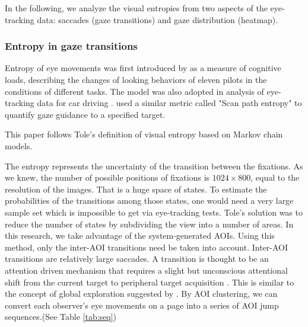 In the following, we analyze the visual entropies from two aspects of the eye-tracking data: saccades (gaze transitions) and gaze distribution (heatmap).

\subsubsection{Entropy in gaze transitions}
Entropy of eye movements was first introduced by  as a measure of cognitive loads, describing the changes of looking behaviors of eleven pilots in the conditions of different tasks. The model was also adopted in analysis of eye-tracking data for car driving \citep{Gilland2008}.  used a similar metric called "Scan path entropy" to quantify gaze guidance to a specified target.

This paper follows Tole's definition of visual entropy based on Markov chain models.

The entropy represents the uncertainty of the transition between the fixations. As we knew, the number of possible positions of fixations is $1024\times800$, equal to the resolution of the images. That is a huge space of states. To estimate the probabilities of the transitions among those states, one would need a very large sample set which is impossible to get via eye-tracking tests. Tole's solution was to reduce the number of states by subdividing the view into a number of areas. In this research, we take advantage of the system-generated AOIs. Using this method, only the inter-AOI transitions need be taken into account. Inter-AOI transitions are relatively large saccades. A transition is thought to be an attention driven mechanism that requires a slight but unconscious attentional shift from the current target to peripheral target acquisition \citep{Henderson1993}. This is similar to the concept of global exploration suggested by . By AOI clustering, we can convert each observer's eye movements on a page into a series of AOI jump sequences.(See Table \ref{tab:seq})

